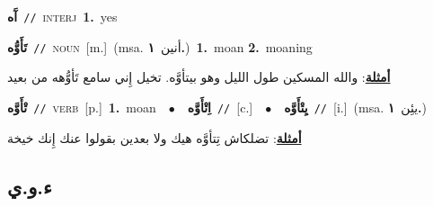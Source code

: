 \documentclass[10pt,a4paper,twoside]{article} %
\begin{document}
\begin{multicols}{2}
{\setlength\topsep{0pt}\textbf{\foreignlanguage{arabic}{آَه}}\ {\color{gray}\texttt{//}\color{black}}\ \textsc{interj}\ \textbf{1.}~yes\ } \vspace{2mm}

{\setlength\topsep{0pt}\textbf{\foreignlanguage{arabic}{تَأَوُّه}}\ {\color{gray}\texttt{//}\color{black}}\ \textsc{noun}\ [m.]\ \color{gray}(msa. \foreignlanguage{arabic}{أنين}~\foreignlanguage{arabic}{\textbf{١.}})\color{black}\ \textbf{1.}~moan  \textbf{2.}~moaning\  \begin{flushright}\color{gray}\foreignlanguage{arabic}{\textbf{\underline{\foreignlanguage{arabic}{أمثلة}}}: والله المسكين طول الليل وهو بيتأوَّه. تخيل إِني سامع تَأوُّهه من بعيد}\end{flushright}\color{black}} \vspace{2mm}

{\setlength\topsep{0pt}\textbf{\foreignlanguage{arabic}{تْأَوَّه}}\ {\color{gray}\texttt{//}\color{black}}\ \textsc{verb}\ [p.]\ \textbf{1.}~moan\ \ $\bullet$\ \ \setlength\topsep{0pt}\textbf{\foreignlanguage{arabic}{اِتْأَوَّه}}\ {\color{gray}\texttt{//}\color{black}}\ [c.]\ \ $\bullet$\ \ \setlength\topsep{0pt}\textbf{\foreignlanguage{arabic}{يِتْأَوَّه}}\ {\color{gray}\texttt{//}\color{black}}\ [i.]\ \color{gray}(msa. \foreignlanguage{arabic}{يئِن}~\foreignlanguage{arabic}{\textbf{١.}})\color{black}\  \begin{flushright}\color{gray}\foreignlanguage{arabic}{\textbf{\underline{\foreignlanguage{arabic}{أمثلة}}}: تضلكاش تِتأوَّه هيك ولا بعدين بقولوا عنك إِنك خيخة}\end{flushright}\color{black}} \vspace{2mm}

\vspace{-3mm}
\subsection*{\color{blue}\foreignlanguage{arabic}{ء.و.ي}\color{blue}{}} 


\end{multicols}
\end{document}
